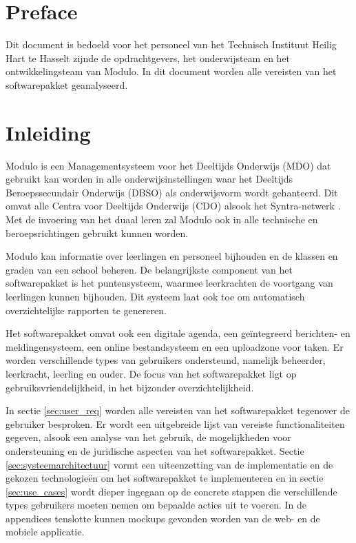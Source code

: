 \documentclass[a4paper]{article}
\begin{document}


\tableofcontents
\newpage

\section{Preface}
Dit document is bedoeld voor het personeel van het Technisch Instituut Heilig Hart te Hasselt \cite{TIHH} zijnde de opdrachtgevers, het onderwijsteam en het ontwikkelingsteam van Modulo. In dit document worden alle vereisten van het softwarepakket geanalyseerd.

\section{Inleiding}
Modulo is een Managementsysteem voor het Deeltijds Onderwijs (MDO) dat gebruikt kan worden in alle onderwijsinstellingen waar het Deeltijds Beroepssecundair Onderwijs (DBSO) \cite{DBSO} als onderwijsvorm wordt gehanteerd. Dit omvat alle Centra voor Deeltijds Onderwijs (CDO) \cite{CDO} alsook het Syntra-netwerk \cite{Syntra}. Met de invoering van het duaal leren \cite{Duaal_leren} zal Modulo ook in alle technische en beroepsrichtingen gebruikt kunnen worden.

Modulo kan informatie over leerlingen en personeel bijhouden en de klassen en graden van een school beheren. De belangrijkste component van het softwarepakket is het puntensysteem, waarmee leerkrachten de voortgang van leerlingen kunnen bijhouden. Dit systeem laat ook toe om automatisch overzichtelijke rapporten te genereren.

Het softwarepakket omvat ook een digitale agenda, een geïntegreerd berichten- en meldingensysteem, een online bestandsysteem en een uploadzone voor taken. Er worden verschillende types van gebruikers ondersteund, namelijk beheerder, leerkracht, leerling en ouder. De focus van het softwarepakket ligt op gebruiksvriendelijkheid, in het bijzonder overzichtelijkheid.

In sectie \ref{sec:user_req} worden alle vereisten van het softwarepakket tegenover de gebruiker besproken. Er wordt een uitgebreide lijst van vereiste functionaliteiten gegeven, alsook een analyse van het gebruik, de mogelijkheden voor ondersteuning en de juridische aspecten van het softwarepakket. Sectie \ref{sec:systeemarchitectuur} vormt een uiteenzetting van de implementatie en de gekozen technologieën om het softwarepakket te implementeren en in sectie \ref{sec:use_cases} wordt dieper ingegaan op de concrete stappen die verschillende types gebruikers moeten nemen om bepaalde acties uit te voeren. In de appendices tenslotte kunnen mockups gevonden worden van de web- en de mobiele applicatie.
\end{document}
